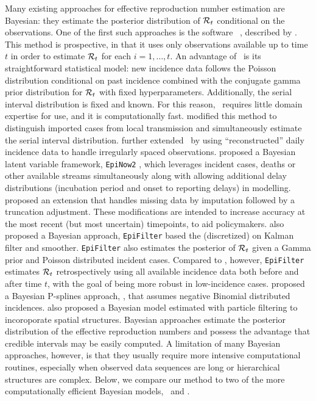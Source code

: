 Many existing approaches for effective reproduction number estimation are
Bayesian: they estimate the posterior distribution of $\mathcal{R}_t$ conditional on
the observations. One of the first such approaches is the software \EpiEstim\
\citep{cori2020package}, described by \citet{cori2013new}. This method is
prospective, in that it uses only observations available up to time $t$ in order to
estimate $\mathcal{R}_t$ for each $i = 1,\ldots, t$. An advantage of \EpiEstim\ is its
straightforward statistical model: new incidence data follows the Poisson
distribution conditional on past incidence combined with the conjugate gamma prior
distribution for $\mathcal{R}_t$ with fixed hyperparameters. Additionally, the serial
interval distribution is fixed and known. For this reason, \EpiEstim\ requires
little domain expertise for use, and it is computationally fast.
\citet{thompson2019improved} modified this method to distinguish imported cases from local transmission and
simultaneously estimate the serial interval distribution.
\citet{nash2023estimating} further extended \EpiEstim\ by using
``reconstructed'' daily incidence data to handle irregularly spaced observations.
% 
\cite{abbott2020estimating} proposed a Bayesian latent variable framework,
\texttt{EpiNow2} \citep{EpiNow2}, which leverages incident cases, deaths or
other available streams simultaneously along with allowing additional delay
distributions (incubation period and onset to reporting delays) in modelling.  
\citet{lison2023generative} proposed an extension that handles missing data by
imputation followed by a truncation adjustment. These modifications are intended
to increase accuracy at the most recent (but most uncertain) timepoints, to aid policymakers.
%
\citet{parag2021improved} also proposed a Bayesian approach, \texttt{EpiFilter}
based the (discretized) on Kalman filter and smoother. \texttt{EpiFilter} also
estimates the posterior of $\mathcal{R}_t$ given a Gamma prior and Poisson distributed
incident cases. Compared to \EpiEstim, however, \texttt{EpiFilter} estimates
$\mathcal{R}_t$ retrospectively using all available incidence data both before and
after time $t$, with the goal of being more robust in low-incidence cases.  
\citet{gressani2022epilps} proposed a Bayesian P-splines approach, \EpiLPS, that
assumes negative Binomial distributed incidences. \citet{trevisin2023spatially}
also proposed a Bayesian model estimated with particle filtering to incoroporate
spatial structures.
%
Bayesian approaches estimate the posterior distribution of the effective
reproduction numbers and possess the advantage that credible intervals may be
easily computed. A limitation of many Bayesian approaches, however, is that they
usually require more intensive computational routines, especially when observed
data sequences are long or hierarchical structures are complex.  Below, we
compare our method to two of the more computationally efficient Bayesian models,
\EpiEstim\ and \EpiLPS. 

